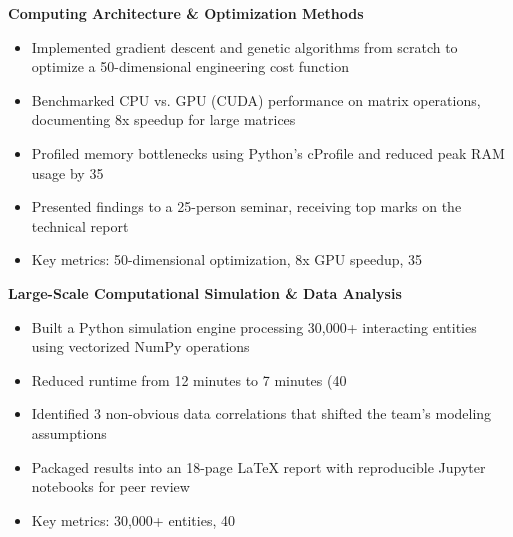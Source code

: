 \documentclass[11pt,a4paper]{article}
\begin{document}
\textbf{ Computing Architecture & Optimization Methods }
\begin{itemize}[leftmargin=*,nosep,topsep=2pt]
    
    \item Implemented gradient descent and genetic algorithms from scratch to optimize a 50-dimensional engineering cost function
    
    \item Benchmarked CPU vs. GPU (CUDA) performance on matrix operations, documenting 8x speedup for large matrices
    
    \item Profiled memory bottlenecks using Python's cProfile and reduced peak RAM usage by 35%
    
    \item Presented findings to a 25-person seminar, receiving top marks on the technical report
    
    \item Key metrics: 50-dimensional optimization, 8x GPU speedup, 35%
    
\end{itemize}

\textbf{ Large-Scale Computational Simulation & Data Analysis }
\begin{itemize}[leftmargin=*,nosep,topsep=2pt]
    
    \item Built a Python simulation engine processing 30,000+ interacting entities using vectorized NumPy operations
    
    \item Reduced runtime from 12 minutes to 7 minutes (40%
    
    \item Identified 3 non-obvious data correlations that shifted the team's modeling assumptions
    
    \item Packaged results into an 18-page LaTeX report with reproducible Jupyter notebooks for peer review
    
    \item Key metrics: 30,000+ entities, 40%
    
\end{itemize}
\end{document}
